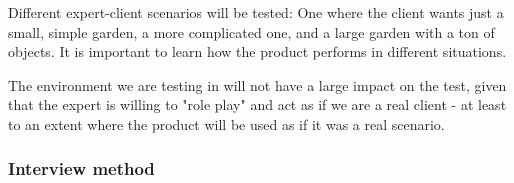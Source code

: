 Different expert-client scenarios will be tested: One where the client wants just a small, simple garden, a more complicated one, and a large garden with a ton of objects. It is important to learn how the product performs in different situations. 

The environment we are testing in will not have a large impact on the test, given that the expert is willing to "role play" and act as if we are a real client - at least to an extent where the product will be used as if it was a real scenario. 


\subsubsection{Interview method}

\fi
